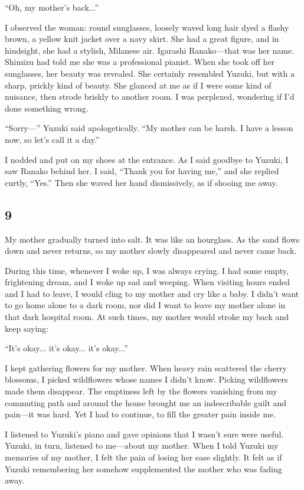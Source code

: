 \documentclass[
    a4paper,
    12pt,
    twoside,
    openany,
    UTF8,
    fontset=windows
]{ctexbook}
\begin{document}
``Oh, my mother's back...''

I observed the woman: round sunglasses, loosely waved long hair dyed a flashy brown, a yellow knit jacket over a navy skirt. She had a great figure, and in hindsight, she had a stylish, Milanese air. Igarashi Ranako---that was her name. Shimizu had told me she was a professional pianist. When she took off her sunglasses, her beauty was revealed. She certainly resembled Yuzuki, but with a sharp, prickly kind of beauty. She glanced at me as if I were some kind of nuisance, then strode briskly to another room. I was perplexed, wondering if I'd done something wrong.

``Sorry---'' Yuzuki said apologetically. ``My mother can be harsh. I have a lesson now, so let's call it a day.''

I nodded and put on my shoes at the entrance. As I said goodbye to Yuzuki, I saw Ranako behind her. I said, ``Thank you for having me,'' and she replied curtly, ``Yes.'' Then she waved her hand dismissively, as if shooing me away.


\subsection*{9}

My mother gradually turned into salt. It was like an hourglass. As the sand flows down and never returns, so my mother slowly disappeared and never came back.

During this time, whenever I woke up, I was always crying. I had some empty, frightening dream, and I woke up sad and weeping. When visiting hours ended and I had to leave, I would cling to my mother and cry like a baby. I didn't want to go home alone to a dark room, nor did I want to leave my mother alone in that dark hospital room. At such times, my mother would stroke my back and keep saying:

``It's okay... it's okay... it's okay...''

I kept gathering flowers for my mother. When heavy rain scattered the cherry blossoms, I picked wildflowers whose names I didn't know. Picking wildflowers made them disappear. The emptiness left by the flowers vanishing from my commuting path and around the house brought me an indescribable guilt and pain—it was hard. Yet I had to continue, to fill the greater pain inside me.

I listened to Yuzuki's piano and gave opinions that I wasn't sure were useful. Yuzuki, in turn, listened to me---about my mother. When I told Yuzuki my memories of my mother, I felt the pain of losing her ease slightly. It felt as if Yuzuki remembering her somehow supplemented the mother who was fading away.
\end{document}

